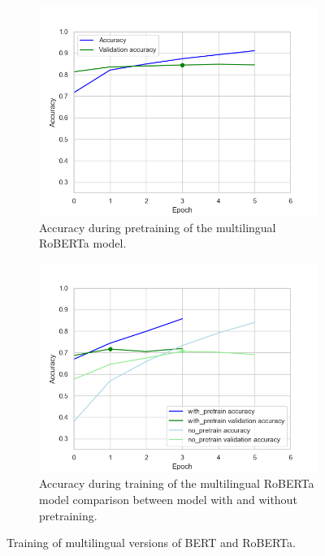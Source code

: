 \documentclass[acmsmall,nonacm]{acmart}
\begin{document}
\begin{figure}[H]
\begin{subfigure}[b]{0.4\linewidth}
    \label{fig:multilingual_bert_model_train}
    \vspace{2ex}
  \end{subfigure} 
  \begin{subfigure}[b]{0.4\linewidth}
    \includegraphics[width=\textwidth]{assets/tf-xlm-roberta-base_accuracy.png}
    \caption{Accuracy during pretraining of the multilingual RoBERTa model.}
    \label{fig:multilingual_roberta_model_pretrain}
  \end{subfigure}%
  \hfill
  \begin{subfigure}[b]{0.4\linewidth}
    \includegraphics[width=\textwidth]{assets/tf-xlm-roberta-base_comparison_with_pretrain_no_pretrain.png}
    \caption{Accuracy during training of the multilingual RoBERTa model comparison between model with and without pretraining.}
    \label{fig:multilingual_roberta_model_train}
  \end{subfigure} 
  \caption{Training of multilingual versions of BERT and RoBERTa.}
  \label{fig:multilang_bert_roberta_training} 
\end{figure}
\end{document}
